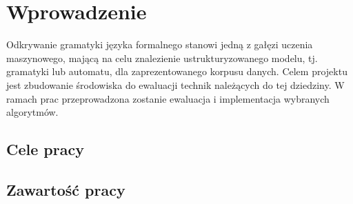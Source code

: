 \chapter{Wprowadzenie}
\label{cha:wprowadzenie}

Odkrywanie gramatyki języka formalnego stanowi jedną z gałęzi uczenia maszynowego, mającą na celu znalezienie ustrukturyzowanego modelu, tj. gramatyki lub automatu, dla zaprezentowanego korpusu danych. Celem projektu jest zbudowanie środowiska do ewaluacji technik należących do tej dziedziny. W ramach prac przeprowadzona zostanie ewaluacja i implementacja wybranych algorytmów.


\section{Cele pracy}
\label{sec:celePracy}


\section{Zawartość pracy}
\label{sec:zawartoscPracy}
